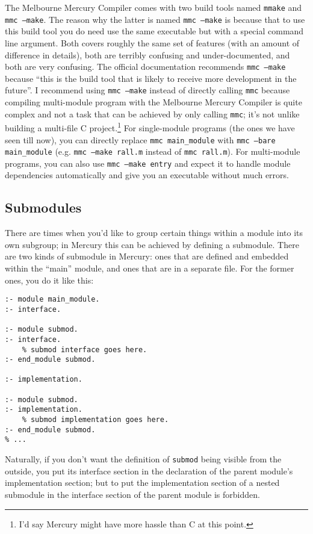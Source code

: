 The Melbourne Mercury Compiler comes with two build tools named \texttt{mmake} and \texttt{mmc --make}. The reason why the latter is named \texttt{mmc --make} is because that to use this build tool you do need use the same executable but with a special command line argument. Both covers roughly the same set of features (with an amount of difference in details), both are terribly confusing and under-documented, and both are very confusing. The official documentation recommends \texttt{mmc --make} because ``this is the build tool that is likely to receive more development in the future''. I recommend using \texttt{mmc --make} instead of directly calling \texttt{mmc} because compiling multi-module program with the Melbourne Mercury Compiler is quite complex and not a task that can be achieved by only calling \texttt{mmc}; it's not unlike building a multi-file C project.\footnote{I'd say Mercury might have more hassle than C at this point.} For single-module programs (the ones we have seen till now), you can directly replace \texttt{mmc \lbrack main\_module\rbrack} with \texttt{mmc --bare \lbrack main\_module\rbrack} (e.g. \texttt{mmc --make rall.m} instead of \texttt{mmc rall.m}). For multi-module programs, you can also use \texttt{mmc --make \lbrack entry\rbrack} and expect it to handle module dependencies automatically and give you an executable without much errors.

\subsection{Submodules}

There are times when you'd like to group certain things within a module into its own subgroup; in Mercury this can be achieved by defining a submodule. There are two kinds of submodule in Mercury: ones that are defined and embedded within the ``main'' module, and ones that are in a separate file. For the former ones, you do it like this:

\begin{lstlisting}[language=Mercury]
:- module main_module.
:- interface.

:- module submod.
:- interface.
    % submod interface goes here.
:- end_module submod.

:- implementation.

:- module submod.
:- implementation.
    % submod implementation goes here.
:- end_module submod.
% ...
\end{lstlisting}

Naturally, if you don't want the definition of \texttt{submod} being visible from the outside, you put its interface section in the declaration of the parent module's implementation section; but to put the implementation section of a nested submodule in the interface section of the parent module is forbidden.

